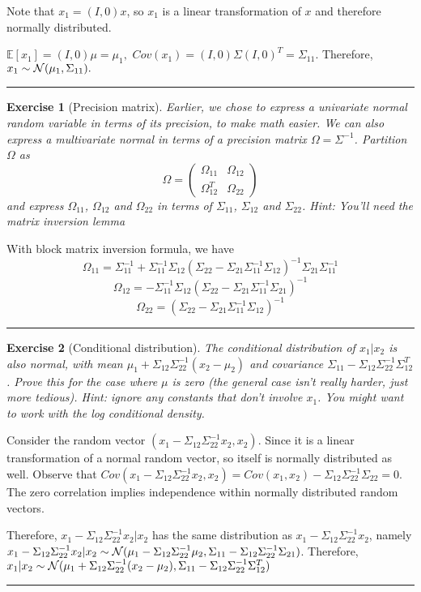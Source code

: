 \documentclass[twoside]{article}
\newcounter{lecnum}
\newtheorem{exercise}{Exercise}[lecnum]
\newenvironment{proof}{{\bf Proof:}}{\hfill\rule{2mm}{2mm}}
\newcommand\E{\mathbb{E}}
\begin{document}
\begin{proof}
Note that $x_1 = (I, 0)x$, so $x_1$ is a linear transformation of $x$ and therefore normally distributed. 

$\E [x_1] = (I, 0)\mu = \mu_1,$
$Cov(x_1) = (I,0)\Sigma(I,0)^T = \Sigma_{11}.$
Therefore, $x_1 \sim {\cal N} (\mu_1, \Sigma_{11}).$
\end{proof}
\begin{exercise}[Precision matrix]
  Earlier, we chose to express a univariate normal random variable in terms of its precision, to make math easier. We can also express a multivariate normal in terms of a precision matrix $\Omega = \Sigma^{-1}$. Partition $\Omega$ as
  $$\Omega = \begin{pmatrix}\Omega_{11} & \Omega_{12} \\ \Omega_{12}^T & \Omega_{22}\end{pmatrix}$$
  and express $\Omega_{11}$, $\Omega_{12}$ and $\Omega_{22}$ in terms of $\Sigma_{11}$, $\Sigma_{12}$ and $\Sigma_{22}$. \textit{Hint: You'll need the matrix inversion lemma}
\end{exercise}
\begin{proof}
With block matrix inversion formula, we have 
$$\Omega_{11} = \Sigma_{11}^{-1}+\Sigma_{11}^{-1}\Sigma_{12}(\Sigma_{22}-\Sigma_{21}\Sigma_{11}^{-1}\Sigma_{12})^{-1}\Sigma_{21}\Sigma_{11}^{-1}$$
$$\Omega_{12} = -\Sigma_{11}^{-1}\Sigma_{12}(\Sigma_{22}-\Sigma_{21}\Sigma_{11}^{-1}\Sigma_{21})^{-1}$$
$$\Omega_{22} = (\Sigma_{22}-\Sigma_{21}\Sigma_{11}^{-1}\Sigma_{12})^{-1}$$

\end{proof}
\begin{exercise}[Conditional distribution]
  The conditional distribution of $x_1|x_2$ is also normal, with mean $\mu_1+\Sigma_{12}\Sigma_{22}^{-1}(x_2-\mu_2)$ and covariance $\Sigma_{11} - \Sigma_{12}\Sigma_{22}^{-1}\Sigma_{12}^T$. Prove this for the case where $\mu$ is zero (the general case isn't really harder, just more tedious). \textit{Hint: ignore any constants that don't involve $x_1$. You might want to work with the log conditional density.}
\end{exercise}
\begin{proof}
Consider the random vector $(x_1- \Sigma_{12}\Sigma_{22}^{-1}x_2,x_2)$. Since it is a linear transformation of a normal random vector, so itself is normally distributed as well. Observe that $Cov(x_1-\Sigma_{12}\Sigma_{22}^{-1}x_2,x_2) = Cov(x_1, x_2) - \Sigma_{12}\Sigma_{22}^{-1}\Sigma_{22} = 0.$ The zero correlation implies independence within normally distributed random vectors. 

Therefore, $x_1- \Sigma_{12}\Sigma_{22}^{-1}x_2|x_2$ has the same distribution as $x_1- \Sigma_{12}\Sigma_{22}^{-1}x_2$, namely $x_1- \Sigma_{12}\Sigma_{22}^{-1}x_2|x_2 \sim {\cal N}(\mu_1-\Sigma_{12}\Sigma_{22}^{-1}\mu_2, \Sigma_{11}-\Sigma_{12}\Sigma_{22}^{-1}\Sigma_{21})$. Therefore, $x_1|x_2\sim {\cal N}(\mu_1+\Sigma_{12}\Sigma_{22}^{-1}(x_2-\mu_2), \Sigma_{11} - \Sigma_{12}\Sigma_{22}^{-1}\Sigma_{12}^T) $

\end{proof}
\end{document}
